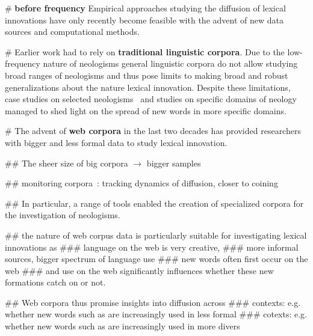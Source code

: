 \documentclass[draft, a4paper, abstract=on]{scrartcl}
\renewcommand{\hw}[1]{\textbf{#1}}
\begin{document}
    \begin{easylist}[itemize]

      # \hw{before frequency} Empirical approaches studying the diffusion of lexical innovations have only recently become feasible with the advent of new data sources and computational methods.

      # Earlier work had to rely on \hw{traditional linguistic corpora}. Due to the low-frequency nature of neologisms general linguistic corpora do not allow studying broad ranges of neologisms and thus pose limits to making broad and robust generalizations about the nature lexical innovation. Despite these limitations, case studies on selected neologisms~\parencite{Hohenhaus2006BouncebackabilityWebascorpusbased} and studies on specific domains of neology~\parencite{Elsen2004Neologismen} managed to shed light on the spread of new words in more specific domains.

      # The advent of \hw{web corpora} in the last two decades has provided researchers with bigger and less formal data to study lexical innovation.

        ## The sheer size of big corpora $\rightarrow$ bigger samples

        ## monitoring corpora~\parencite{Davies2013CorpusNews}: tracking dynamics of diffusion, closer to coining

        ## In particular, a range of tools enabled the creation of specialized corpora for the investigation of neologisms.~\parencite{Renouf2006WebCorpIntegrated, Kerremans2012NeoCrawlerIdentifying,LemnitzerWortwarte,Gerard2017LogoscopeSemiautomatic,Cartier2017NeoveilleWeb}

        ## the nature of web corpus data is particularly suitable for investigating lexical innovations as
          ### language on the web is very creative,
          ### more informal sources, bigger spectrum of language use
          ### new words often first occur on the web
          ### and use on the web significantly influences whether these new formations catch on or not.

        ## Web corpora thus promise insights into diffusion across
          ### contexts: e.g. whether new words such as  are increasingly used in less formal
          ### cotexts: e.g. whether new words such as \ol{} are increasingly used in more divers



\end{easylist}
\end{document}

